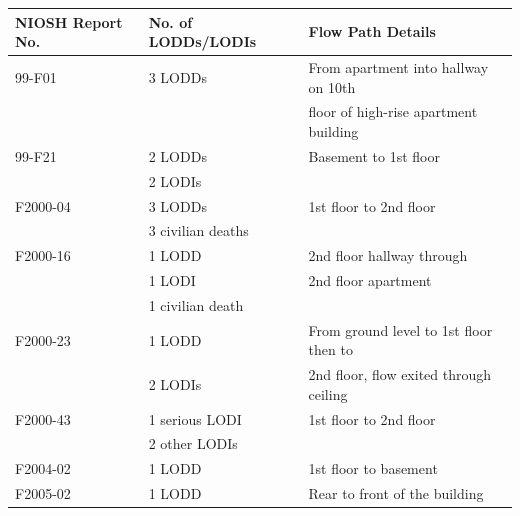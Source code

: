 \begin{table}
\centering
{}\label{tab:lodd}
\begin{tabular}{lll}
\toprule[1.5pt]
NIOSH Report No. & No. of LODDs/LODIs & Flow Path Details  \\
\midrule
99-F01   \cite{NIOSH:Pettit}        &  3 LODDs            &  From apartment into hallway on 10th                  \\
                                    &                     &  floor of high-rise apartment building                \\
99-F21   \cite{NIOSH:Washenitz}     &  2 LODDs            &  Basement to 1st floor                                \\
                                    &  2 LODIs            &                                                       \\
F2000-04 \cite{NIOSH:Mezzanotte}    &  3 LODDs            &  1st floor to 2nd floor                               \\
                                    &  3 civilian deaths  &                                                       \\
F2000-16 \cite{NIOSH:McFall}        &  1 LODD             &  2nd floor hallway through                            \\
                                    &  1 LODI             &  2nd floor apartment                                  \\
                                    &  1 civilian death   &                                                       \\
F2000-23 \cite{NIOSH:McFall2}       &  1 LODD             &  From ground level to 1st floor then to               \\
                                    &  2 LODIs            &  2nd floor, flow exited through ceiling               \\
F2000-43 \cite{NIOSH:McFall3}       &  1 serious LODI     &  1st floor to 2nd floor                               \\
                                    &  2 other LODIs      &                                                       \\
F2004-02 \cite{NIOSH:Berardinelli}  &  1 LODD             &  1st floor to basement                                \\
F2005-02 \cite{NIOSH:Koedam}        &  1 LODD             &  Rear to front of the building                        \\

\end{tabular}
\end{table}
